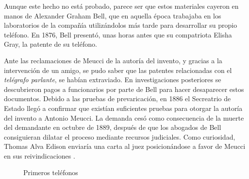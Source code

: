 Aunque este hecho no está probado, parece ser que estos materiales cayeron en manos de Alexander Graham Bell, que en aquella época trabajaba en los laboratorios de la compañía utilizándolos más tarde para desarrollar su propio teléfono. En 1876, Bell presentó, unas horas antes que su compatriota Elisha Gray, la patente de su teléfono. 

Ante las reclamaciones de Meucci de la autoría del invento, y gracias a la intervención de un amigo, se pudo saber que las patentes relacionadas con el \textit{telégrafo parlante}, se habían extraviado. En investigaciones posteriores se descubrieron pagos a funcionarios por parte de Bell para hacer desaparecer estos documentos. Debido a las pruebas de prevaricación, en 1886 el Secreatrio de Estado llegó a confirmar que existían suficientes pruebas para otorgar la autoría del invento a Antonio Meucci. La demanda cesó como consecuencia de la muerte del demandante en octubre de 1889, después de que los abogados de Bell consiguieran dilatar el proceso mediante recursos judiciales. Como curiosidad, Thomas Alva Edison enviaría una carta al juez posicionándose a favor de Meucci en sus reivindicaciones \cite{Carb07}.

\begin{figure}[h!btp]
	\begin{adjustbox}{minipage=\linewidth, fbox}
		\centering
		\hspace{10mm}
	\end{adjustbox}
\caption{Primeros teléfonos}
	\label{fig:primeros-teléfonos}
\end{figure}


